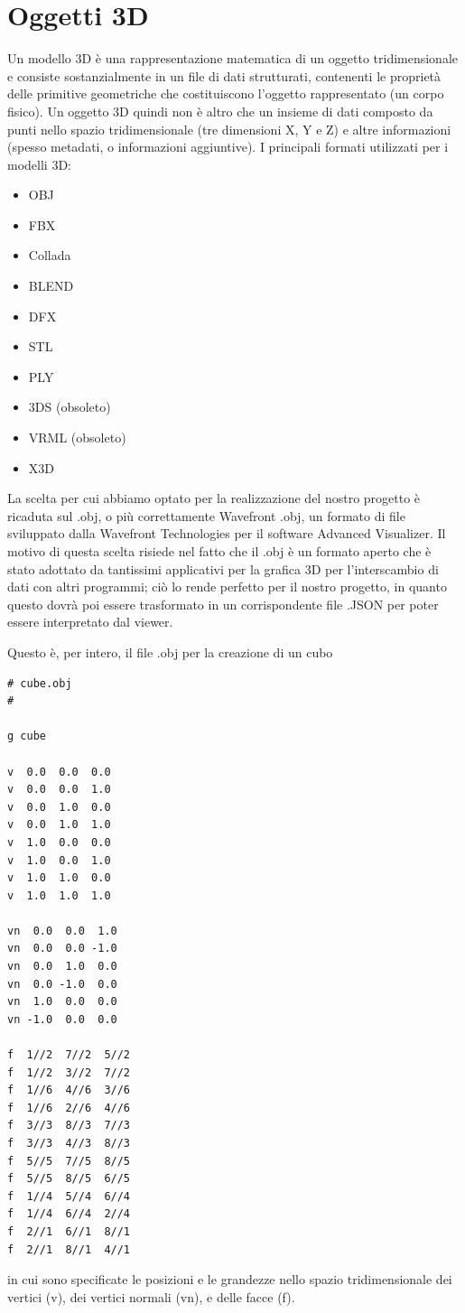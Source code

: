 \section{Oggetti 3D}
Un modello 3D è una rappresentazione matematica di un oggetto tridimensionale e consiste sostanzialmente in un file di dati strutturati, contenenti le proprietà delle primitive geometriche che costituiscono l'oggetto rappresentato (un corpo fisico). Un oggetto 3D quindi non è altro che un insieme di dati composto da punti nello spazio tridimensionale (tre dimensioni X, Y e Z) e altre informazioni (spesso metadati, o informazioni aggiuntive).
I principali formati utilizzati per i modelli 3D:
\begin{itemize}
	\item OBJ
	\item FBX
	\item Collada
	\item BLEND
	\item DFX
	\item STL
	\item PLY
	\item 3DS (obsoleto)
	\item VRML (obsoleto)
	\item X3D
\end{itemize}
La scelta per cui abbiamo optato per la realizzazione del nostro progetto è ricaduta sul .obj, o più correttamente Wavefront .obj, un formato di file sviluppato dalla Wavefront Technologies per il software Advanced Visualizer. Il motivo di questa scelta risiede nel fatto che il .obj è un formato aperto che è stato adottato da tantissimi applicativi per la grafica 3D per l'interscambio di dati con altri programmi; ciò lo rende perfetto per il nostro progetto, in quanto questo dovrà poi essere trasformato in un corrispondente file .JSON per poter essere interpretato dal viewer.

Questo è, per intero, il file .obj per la creazione di un cubo

\begin{lstlisting}[caption={Cube.obj}, style=JavaScriptCode]
# cube.obj
#

g cube

v  0.0  0.0  0.0
v  0.0  0.0  1.0
v  0.0  1.0  0.0
v  0.0  1.0  1.0
v  1.0  0.0  0.0
v  1.0  0.0  1.0
v  1.0  1.0  0.0
v  1.0  1.0  1.0

vn  0.0  0.0  1.0
vn  0.0  0.0 -1.0
vn  0.0  1.0  0.0
vn  0.0 -1.0  0.0
vn  1.0  0.0  0.0
vn -1.0  0.0  0.0

f  1//2  7//2  5//2
f  1//2  3//2  7//2 
f  1//6  4//6  3//6 
f  1//6  2//6  4//6 
f  3//3  8//3  7//3 
f  3//3  4//3  8//3 
f  5//5  7//5  8//5 
f  5//5  8//5  6//5 
f  1//4  5//4  6//4 
f  1//4  6//4  2//4 
f  2//1  6//1  8//1 
f  2//1  8//1  4//1 
\end{lstlisting}
in cui sono specificate le posizioni e le grandezze nello spazio tridimensionale dei vertici (v), dei vertici normali (vn), e delle facce (f).

